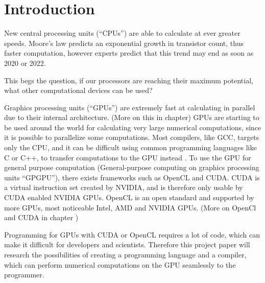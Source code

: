 \chapter{Introduction}\label{ch:introduction}

New central processing units (``CPUs'') are able to calculate at ever greater speeds.
Moore's law predicts an exponential growth in transistor count, thus faster computation, however experts predict that this trend may end as soon as 2020 or 2022. \citep{Moore2013}

This begs the question, if our processors are reaching their maximum potential, what other computational devices can be used?

Graphics processing units (``GPUs'') are extremely fast at calculating in parallel due to their internal architecture. (More on this in chapter)
GPUs are starting to be used around the world for calculating very large numerical computations, since it is possible to parallelize some computations.
Most compilers, like GCC, targets only the CPU, and it can be difficult using common programming languages like C or C++, to transfer computations to the GPU instead .
To use the GPU for general purpose computation (General-purpose computing on graphics processing units ``GPGPU''), there exists frameworks such as OpenCL and CUDA.
CUDA is a virtual instruction set created by NVIDIA, and is therefore only usable by CUDA enabled NVIDIA GPUs.
OpenCL is an open standard and supported by more GPUs, most noticeable Intel, AMD and NVIDIA GPUs. (More on OpenCl and CUDA in chapter )

Programming for GPUs with CUDA or OpenCL requires a lot of code, which can make it difficult for developers and scientists.
Therefore this project paper will research the possibilities of creating a programming language and a compiler, which can perform numerical computations on the GPU seamlessly to the programmer. 
